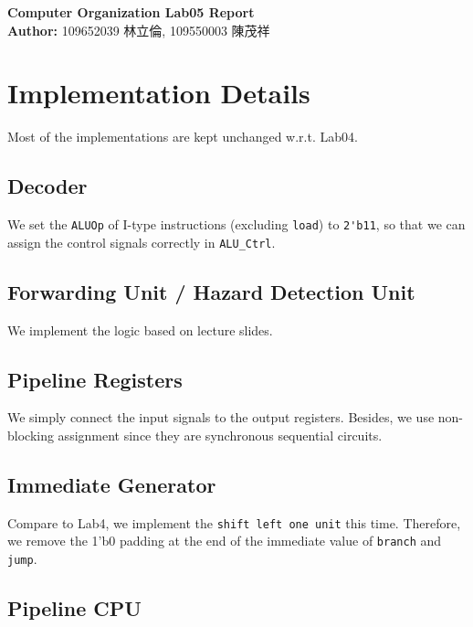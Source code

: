 \documentclass{article}
\begin{document}
\begin{CJK*}{UTF8}{bkai}
    \begin{center}
        {\Huge \textbf{Computer Organization Lab05 Report}} \\
        {\large \textbf{Author:} 109652039 林立倫, 109550003 陳茂祥}
    \end{center}
\end{CJK*}

\section{Implementation Details}

Most of the implementations are kept unchanged w.r.t. Lab04.


\subsection{Decoder}
    
    We set the \verb|ALUOp| of I-type instructions (excluding \verb|load|) to \verb|2'b11|, 
    so that we can assign the control signals correctly in \verb|ALU_Ctrl|.

\subsection{Forwarding Unit / Hazard Detection Unit}

    We implement the logic based on lecture slides.

\subsection{Pipeline Registers}

    We simply connect the input signals to the output registers. 
    Besides, we use non-blocking assignment since they are synchronous sequential circuits.

\subsection{Immediate Generator}

    Compare to Lab4, we implement the \verb|shift left one unit| this time. 
    Therefore, we remove the 1'b0 padding at the end of the immediate value of \verb|branch| and \verb|jump|.
    
\subsection{Pipeline CPU}
\end{document}
